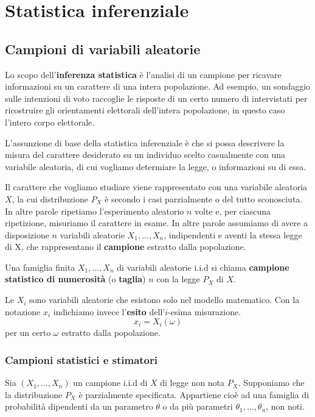 \part{Statistica inferenziale}

\chapter{Campioni di variabili aleatorie}
Lo scopo dell’\textbf{inferenza statistica} è l'analisi di un campione per ricavare informazioni
su un carattere di una intera popolazione. Ad esempio, un sondaggio sulle intenzioni di voto
raccoglie le risposte di un certo numero di intervistati per ricostruire gli orientamenti
elettorali dell’intera popolazione, in questo caso l’intero corpo elettorale.

L’assunzione di base della statistica inferenziale è che si possa descrivere la misura del carattere
desiderato su un individuo scelto casualmente con una variabile aleatoria, di cui vogliamo
determiare la legge, o informazioni su di essa.

Il carattere che vogliamo studiare viene rappresentato con una variabile aleatoria
$X$, la cui distribuzione $P_X$ è secondo i casi parzialmente o del tutto sconosciuta. In altre
parole ripetiamo l'esperimento aleatorio $n$ volte e, per ciascuna ripetizione, misuriamo il
carattere in esame. In altre parole assumiamo di avere a disposizione $n$ variabili aleatorie
$X_1, \dots, X_n$, indipendenti e aventi la stessa legge di X, che rappresentano il
\textbf{campione} estratto dalla popolazione.

\begin{definition}\label{def: campione statistico}
	Una famiglia finita $X_1, \dots, X_n$ di variabili aleatorie i.i.d si chiama
	\textbf{campione statistico di numerosità} (o \textbf{taglia}) $n$ con la legge $P_X$ di $X$.
\end{definition}

\begin{observation}
	Le $X_i$ sono variabili aleatorie che esistono solo nel modello matematico. Con la notazione
	$x_i$ indichiamo invece l'\textbf{esito} dell'$i$-esima misurazione.
	\[ x_i = X_i(\omega) \]
	per un certo $\omega$ estratto dalla popolazione.
\end{observation}

\section{Campioni statistici e stimatori}
Sia $(X_1, \dots, X_n)$ un campione i.i.d di $X$ di legge non nota $P_X$. Supponiamo che la
distribuzione $P_X$ è parzialmente specificata. Appartiene cioè ad una famiglia di probabilità
dipendenti da un parametro $\theta$ o da più parametri $\theta_1, \dots, \theta_n$, non noti.

